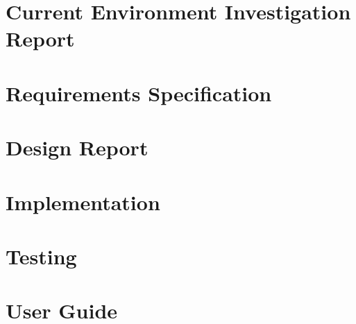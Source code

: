 \documentclass[journal, draftcls]{IEEEtran}
\begin{document}
\section{Current Environment Investigation Report}
\renewcommand{\thepage}{D\arabic{page}}
\newpage
\section{Requirements Specification}
\renewcommand{\thepage}{E\arabic{page}}
\newpage
\section{Design Report}
\renewcommand{\thepage}{F\arabic{page}}
\newpage
\section{Implementation}
\renewcommand{\thepage}{G\arabic{page}}
\newpage
\section{Testing}
\renewcommand{\thepage}{H\arabic{page}}
\newpage
\section{User Guide}
\renewcommand{\thepage}{I\arabic{page}}
\newpage
\end{document}
